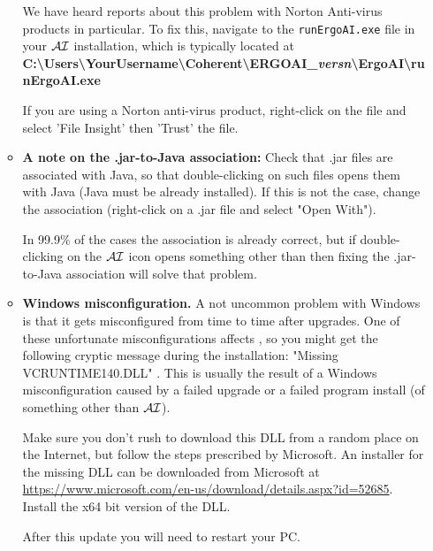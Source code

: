 \documentclass[11pt]{article}
\newcommand{\ERGO}{\mbox{\smaller{\ensuremath{\cal{E}}\smaller{{\sc{RGO}}}}}\xspace}
\newcommand{\ERGOAI}{\mbox{\smaller{\ensuremath{\cal{E}}\smaller{{\sc{RGO}}}}\ensuremath{\cal{AI}}}\xspace}
\newcommand{\bs}{\textbackslash}
\begin{document}
\begin{itemize}
\begin{itemize}
    We have heard reports about this problem with Norton Anti-virus
    products in particular.  To fix this, navigate to the
    \texttt{runErgoAI.exe} 
    file in your \ERGOAI installation, which is typically located at
    \\
    \textbf{C:\bs{}Users\bs{}YourUsername\bs{}Coherent\bs{}ERGOAI\_\textnormal{\emph{versn}}\bs{}ErgoAI\bs{}runErgoAI.exe}

    If you are using a Norton anti-virus product, right-click on the file
    and select 'File Insight' then 'Trust'
    the file.
  \item \textbf{A note on the .jar-to-Java association:} 
    Check that .jar files are
    associated with Java, so that double-clicking on such files opens them
    with Java (Java must be already installed). If this is not the case,
    change the association (right-click on a .jar file and select "Open
    With").

    In 99.9\% of the cases the association is already correct, but if
    double-clicking on the \ERGOAI icon opens something other than \ERGO then
    fixing the .jar-to-Java association will solve that problem.
  \item \textbf{Windows misconfiguration.}  A not uncommon problem with
    Windows is that it gets misconfigured from time to time after
    upgrades. One of these unfortunate misconfigurations affects \ERGO, so
    you might get the following cryptic message during the installation:
    "Missing VCRUNTIME140.DLL" .  This is usually the result of a Windows
    misconfiguration caused by a failed upgrade or a failed program install
    (of something other than \ERGOAI).

    Make sure you don't rush to download this DLL from a random place on
    the Internet, but follow the steps prescribed by Microsoft. An
    installer for the missing DLL can be downloaded from Microsoft at
    \\
    \url{https://www.microsoft.com/en-us/download/details.aspx?id=52685}.
    \\
    Install the x64 bit version of the DLL.

    After this update you will need to restart your PC.
  \end{itemize}


\end{itemize}
\end{document}
